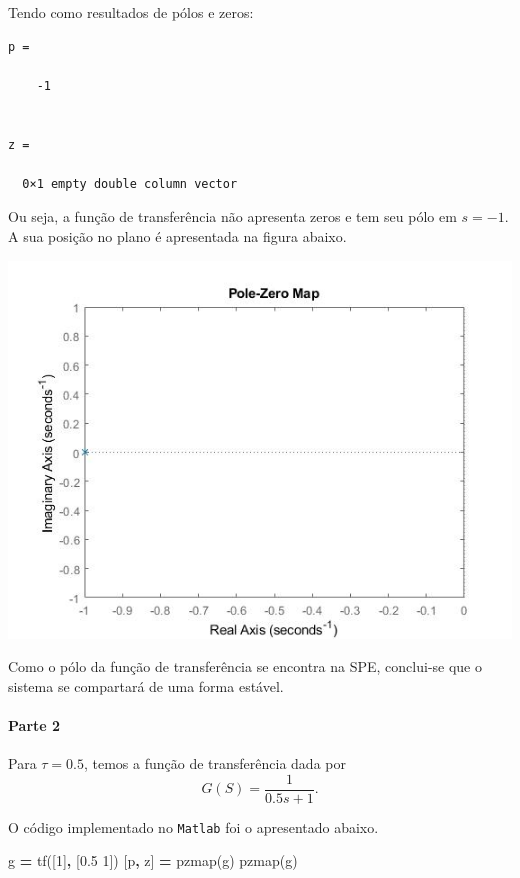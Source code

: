 \documentclass[
]{book}
\newenvironment{Shaded}{\begin{snugshade}}{\end{snugshade}}
\newcommand{\FloatTok}[1]{\textcolor[rgb]{0.00,0.00,0.81}{#1}}
\newcommand{\NormalTok}[1]{#1}
\newcommand{\OperatorTok}[1]{\textcolor[rgb]{0.81,0.36,0.00}{\textbf{#1}}}
\newcommand{\VariableTok}[1]{\textcolor[rgb]{0.00,0.00,0.00}{#1}}
\begin{document}
Tendo como resultados de pólos e zeros:

\begin{verbatim}
p =

    -1


z =

  0×1 empty double column vector
\end{verbatim}

Ou seja, a função de transferência não apresenta zeros e tem seu pólo em \(s = -1\). A sua posição no plano é apresentada na figura abaixo.

\includegraphics{Imagens/Lab2/tau1.jpg}

Como o pólo da função de transferência se encontra na SPE, conclui-se que o sistema se compartará de uma forma estável.

\hypertarget{parte-2}{%
\paragraph*{Parte 2}\label{parte-2}}

Para \(\tau = 0.5\), temos a função de transferência dada por
\[
G(S)= \frac {1}{0.5s+1}.
\]

O código implementado no \texttt{Matlab} foi o apresentado abaixo.

\begin{Shaded}
\begin{Highlighting}[]
\VariableTok{g} \OperatorTok{=} \VariableTok{tf}\NormalTok{([}\FloatTok{1}\NormalTok{]}\OperatorTok{,}\NormalTok{ [}\FloatTok{0.5} \FloatTok{1}\NormalTok{])}
\NormalTok{[}\VariableTok{p}\OperatorTok{,} \VariableTok{z}\NormalTok{] }\OperatorTok{=} \VariableTok{pzmap}\NormalTok{(}\VariableTok{g}\NormalTok{)}
\VariableTok{pzmap}\NormalTok{(}\VariableTok{g}\NormalTok{)}
\end{Highlighting}
\end{Shaded}
\end{document}
